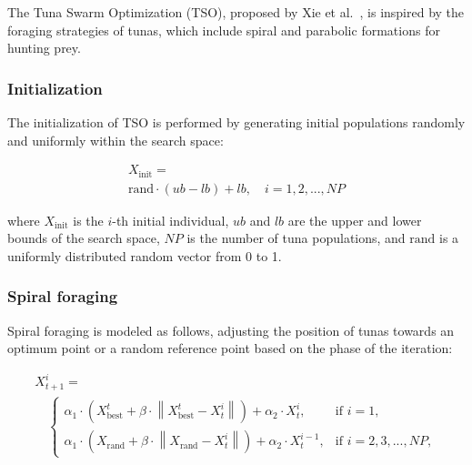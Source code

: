 \documentclass{elsarticle}
\begin{document}
The Tuna Swarm Optimization (TSO), proposed by Xie et al.~\cite{Xie2021}, is inspired by the foraging strategies of tunas, which include spiral and parabolic formations for hunting prey.

\subsubsection{Initialization}

The initialization of TSO is performed by generating initial populations randomly and uniformly within the search space:

\begin{equation}
    \begin{gathered}
        X_{\text{init}} = \\
        \text{rand} \cdot (ub - lb) + lb, \quad i = 1, 2, ..., NP
    \end{gathered}
\end{equation}

\noindent 
where $X_{\text{init}}$ is the $i$-th initial individual, $ub$ and $lb$ are the upper and lower bounds of the search space, $NP$ is the number of tuna populations, and $\text{rand}$ is a uniformly distributed random vector from 0 to 1.

\subsubsection{Spiral foraging}

Spiral foraging is modeled as follows, adjusting the position of tunas towards an optimum point or a random reference point based on the phase of the iteration:

\begin{equation}
    \begin{gathered}
        X_{t+1}^i = \\
        \quad
        \begin{cases}
            \alpha_1 \cdot \left(X_{\text{best}}^t + \beta \cdot \left\lVert X_{\text{best}}^t - X_t^i \right\rVert \right) + \alpha_2 \cdot X_t^i, & \text{if } i = 1,\\
            \alpha_1 \cdot \left(X_{\text{rand}} + \beta \cdot \left\lVert X_{\text{rand}} - X_t^i \right\rVert \right) + \alpha_2 \cdot X_t^{i-1}, & \text{if } i = 2,3,...,NP,
        \end{cases}
    \end{gathered}
\end{equation}
\end{document}
